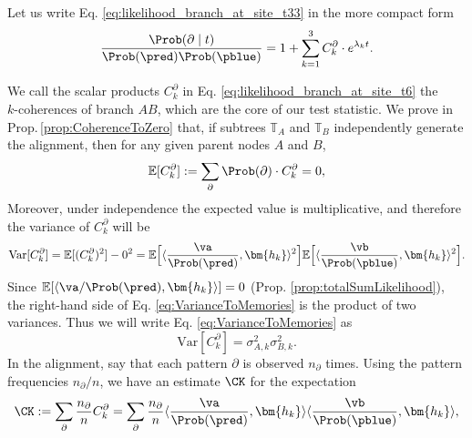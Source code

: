  Let us write Eq. \eqref{eq:likelihood_branch_at_site_t33} in the more compact form
\begin{equation} \label{eq:likelihood_branch_at_site_t6} \frac{\Prob(\partial \mid t)}{\Prob(\pred)\Prob(\pblue)} =  1 + \sum_{k=1}^3 C^\partial_k\cdot e^{\lambda_k t}.
\end{equation}

\noindent We call the scalar products $C^\partial_k$ in Eq. \eqref{eq:likelihood_branch_at_site_t6} the ${k\text{-coherences}}$ of branch $AB$, which are the core of our test statistic.
We prove in Prop.\,\ref{prop:CoherenceToZero} that, if subtrees $\mathbb{T}_A$ and $\mathbb{T}_B$ independently generate the alignment, then for any given parent nodes $A$ and $B$,
    \begin{equation} \label{eq:CoherenceToZero}
    \mathbb{E}[C^\partial_k] := \sum_\partial \Prob(\partial)\cdot C^\partial_k =  0,
    \end{equation}
       Moreover, under independence the expected value is multiplicative, and therefore the variance of $C_k^\partial$ will be 
     \begin{equation} \label{eq:VarianceToMemories}
    \mathrm{Var}[C^\partial_k] = \mathbb{E}[(C^\partial_k)^2] - 0^2 = \mathbb{E}\Big[ \langle \frac{\va}{\Prob(\pred)}, \bm{h_k}\rangle^2 \Big] \mathbb{E} \Big[ \langle \frac{\vb}{\Prob(\pblue)},\bm{h_k}\rangle^2 \Big].
    \end{equation}
  Since $\mathbb{E}[ \langle \va/\Prob(\pred), \bm{h_k}\rangle] = 0$ (Prop. \ref{prop:totalSumLikelihood}), the right-hand side of Eq. \eqref{eq:VarianceToMemories} is the product of two variances. Thus we will write Eq. \eqref{eq:VarianceToMemories} as 
\begin{equation} \label{eq:VarianceToMemories2}
    \mathrm{Var}[C^\partial_k] = \sigma^2_{A,k} \sigma^2_{B,k}.
    \end{equation}
    In the alignment, say that each pattern $\partial$ is observed $n_\partial$ times. Using the pattern frequencies $n_\partial/n$, we have an estimate $\CK$ for the expectation 
    \begin{align}\label{eq:CK}
          \CK := \sum_\partial \frac{n_{\partial}}{n} C_k^\partial = \sum_\partial \frac{n_{\partial}}{n} \langle \frac{\va}{\Prob(\pred)},\bm{h_k}\rangle \langle \frac{\vb}{\Prob(\pblue)}, \bm{h_k} \rangle ,
    \end{align}
